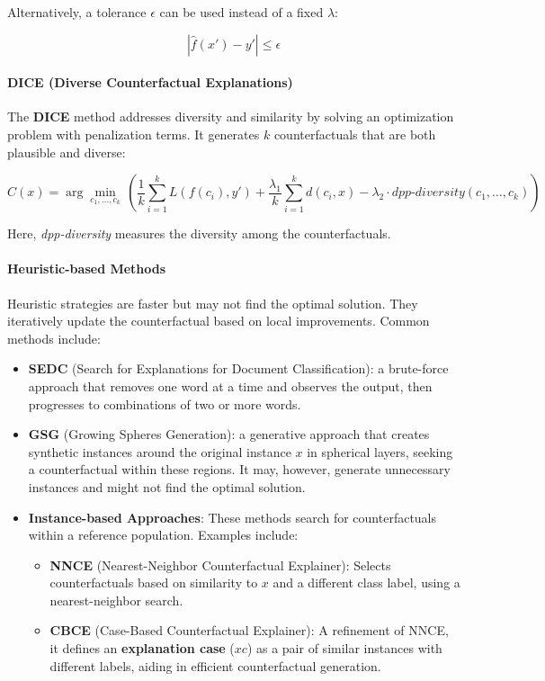 Alternatively, a tolerance \( \epsilon \) can be used instead of a fixed \( \lambda \):

\[
|\hat{f}(x') - y'| \leq \epsilon
\]

\paragraph{DICE (Diverse Counterfactual Explanations)}

The \textbf{DICE} method addresses diversity and similarity by solving an optimization problem with penalization terms. It generates \( k \) counterfactuals that are both plausible and diverse:

\[
C(x) = \arg \min_{c_1, \dots, c_k}\, \left( \frac{1}{k}\sum_{i=1}^k L(f(c_i), y') + \frac{\lambda_1}{k}\sum_{i=1}^k d(c_i, x) - \lambda_2 \cdot \textit{dpp-diversity}(c_1, \dots, c_k) \right)
\]

Here, \textit{dpp-diversity} measures the diversity among the counterfactuals.

\paragraph{Heuristic-based Methods}

Heuristic strategies are faster but may not find the optimal solution. They iteratively update the counterfactual based on local improvements. Common methods include:

\begin{itemize}
    \item \textbf{SEDC} (Search for Explanations for Document Classification): a brute-force approach that removes one word at a time and observes the output, then progresses to combinations of two or more words.
    \item \textbf{GSG} (Growing Spheres Generation): a generative approach that creates synthetic instances around the original instance \( x \) in spherical layers, seeking a counterfactual within these regions. It may, however, generate unnecessary instances and might not find the optimal solution.
    \item \textbf{Instance-based Approaches}: These methods search for counterfactuals within a reference population. Examples include:
    \begin{itemize}
        \item \textbf{NNCE} (Nearest-Neighbor Counterfactual Explainer): Selects counterfactuals based on similarity to \( x \) and a different class label, using a nearest-neighbor search.
        \item \textbf{CBCE} (Case-Based Counterfactual Explainer): A refinement of NNCE, it defines an \textbf{explanation case} (\( xc \)) as a pair of similar instances with different labels, aiding in efficient counterfactual generation.
    \end{itemize}
\end{itemize}
